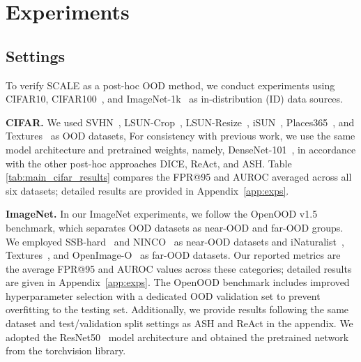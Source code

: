 \documentclass{article} %
\theoremstyle{plain}
\begin{document}
\section{Experiments}

\subsection{Settings}\label{sec:exp_setting}

To verify SCALE as a post-hoc OOD method, we conduct experiments using 
CIFAR10, CIFAR100~\citep{Krizhevsky2009LearningML/CIFAR}, and ImageNet-1k~\citep{DBLP:conf/cvpr/DengDSLL009/ImageNet} as in-distribution (ID) data sources.

\textbf{CIFAR.} 
We used SVHN~\citep{37648/SVHN}, LSUN-Crop~\citep{DBLP:journals/corr/YuZSSX15/LSUN}, LSUN-Resize~\citep{DBLP:journals/corr/YuZSSX15/LSUN}, iSUN~\citep{DBLP:journals/corr/XuEZFKX15/iSUN}, Places365~\citep{DBLP:journals/pami/ZhouLKO018/Place}, and Textures~\citep{DBLP:conf/cvpr/CimpoiMKMV14/Textures} as OOD datasets, 
For consistency with previous work, we use the same model architecture and pretrained weights, namely, DenseNet-101~\citep{DBLP:conf/cvpr/HuangLMW17/DenseNet}, in accordance with the other post-hoc approaches DICE, ReAct, and ASH. 
Table \ref{tab:main_cifar_results} compares the 
FPR@95 and AUROC averaged across all six datasets; detailed results are provided in Appendix~\ref{app:exps}. 

\textbf{ImageNet.} In our ImageNet experiments, we follow the OpenOOD v1.5~\citep{DBLP:journals/corr/abs-2306-09301/OpenOODv1.5} benchmark, which separates OOD datasets as near-OOD and far-OOD groups. We employed SSB-hard~\citep{DBLP:conf/iclr/Vaze0VZ22/SSB} and NINCO~\citep{DBLP:conf/icml/BitterwolfM023/NINCO} as near-OOD datasets and iNaturalist~\citep{DBLP:conf/cvpr/HornASCSSAPB18/INaturalist}, Textures~\citep{DBLP:conf/cvpr/CimpoiMKMV14/Textures}, and OpenImage-O~\citep{DBLP:conf/cvpr/Wang0F022/OpenImage-O} as far-OOD datasets. Our reported metrics are the average FPR@95 and AUROC values across these categories; detailed results are given in Appendix~\ref{app:exps}. The OpenOOD benchmark includes improved hyperparameter selection with a dedicated OOD validation set to prevent overfitting to the testing set. Additionally, we provide results following the same dataset and test/validation split settings as ASH and ReAct in the appendix. We adopted the ResNet50~\citep{DBLP:conf/cvpr/HeZRS16/ResNet} model architecture and obtained the pretrained network from the torchvision library.
\end{document}
